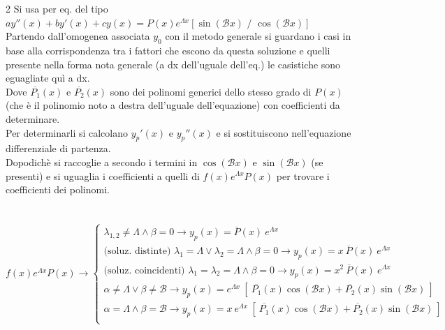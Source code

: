 \documentclass[a4paper, oneside]{article}
\begin{document}
    \begin{multicols}{2}
        \noindent
        Si usa per eq. del tipo $a y''(x) + b y'(x) + cy(x) = P(x) e^{\Lambda x} \left[\sin(\mathcal{B} x) \text{ / }  \cos(\mathcal{B} x)\right]$ \\ Partendo dall'omogenea associata $y_0$ con il metodo generale si guardano i casi in base alla corrispondenza tra i fattori che escono da questa soluzione e quelli presente nella forma nota generale (a dx dell'uguale dell'eq.) le casistiche sono eguagliate quì a dx.\\    Dove $\overline{P_1}(x)$ e $\overline{P_2}(x)$ sono dei polinomi generici dello stesso grado di $P(x)$ (che è il polinomio noto a destra dell'uguale dell'equazione) con coefficienti da determinare.\\
        Per determinarli si calcolano $y_p'(x)$ e $y_p''(x)$ e si sostituiscono nell'equazione differenziale di partenza.\\
        Dopodichè si raccoglie a secondo i termini in $\cos(\mathcal{B} x)$ e $\sin(\mathcal{B} x)$ (se presenti) e si uguaglia i coefficienti a quelli di $f(x) e^{\Lambda x} P(x)$ per trovare i coefficienti dei polinomi.\\
        \columnbreak\\
        \hfil\\
        $f(x) e^{\Lambda x} P(x) \rightarrow
            \begin{cases}
                \lambda_{1,2} \neq \Lambda \land \beta = 0 \to y_p(x) = \overline{P}(x) \ e^{\Lambda x} \\
                \text{(soluz. distinte) }\lambda_1 = \Lambda \lor \lambda_2 = \Lambda \land \beta = 0 \to y_p(x) = x \ \overline{P}(x) \ e^{\Lambda x} \\
                \text{(soluz. coincidenti) }\lambda_1 = \lambda_2 = \Lambda \land \beta = 0 \to y_p(x) = x^2 \ \overline{P}(x) \ e^{\Lambda x} \\
                \alpha \neq \Lambda \lor \beta \neq \mathcal{B} \to y_p(x) = e^{\Lambda x} \ \left[ \ \overline{P_1}(x) \cos(\mathcal{B} x) + \overline{P_2}(x) \sin(\mathcal{B} x) \ \right]\\
                \alpha = \Lambda \land \beta = \mathcal{B} \to y_p(x) = x \ e^{\Lambda x} \ \left[ \ \overline{P_1}(x) \cos(\mathcal{B} x) + \overline{P_2}(x) \sin(\mathcal{B} x) \ \right]\\
            \end{cases}$
    \end{multicols}
    \noindent
\end{document}
